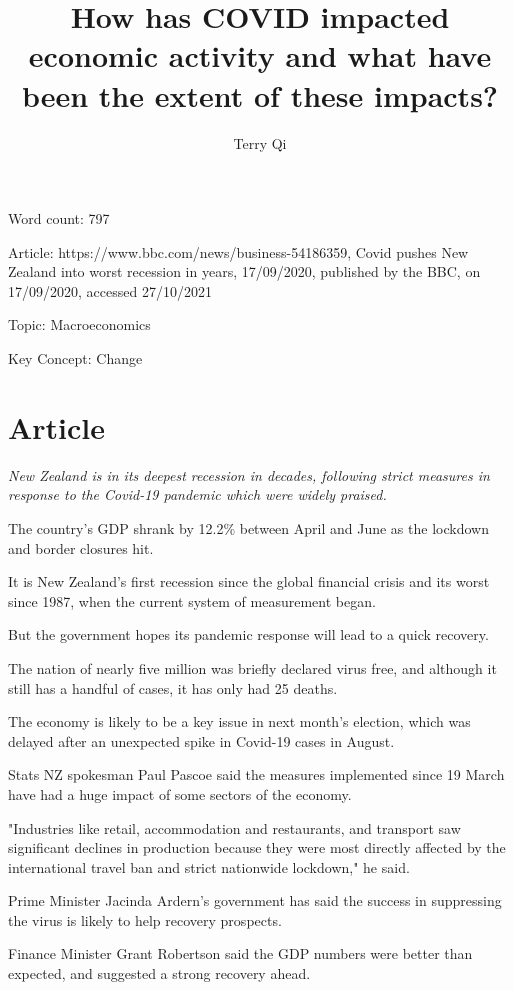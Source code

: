\documentclass[a4paper,12pt]{article}
\title{How has COVID impacted economic activity and what have been the extent of these impacts?}
\author{Terry Qi}
\begin{document}
\maketitle

Word count: 797

Article: https://www.bbc.com/news/business-54186359, Covid pushes New Zealand into worst recession in years, 17/09/2020, published by the BBC, on 17/09/2020, accessed 27/10/2021

Topic: Macroeconomics

Key Concept: Change

\newpage
\section*{Article}

\textit{New Zealand is in its deepest recession in decades, following strict measures in response to the Covid-19 pandemic which were widely praised.}

The country's GDP shrank by 12.2\% between April and June as the lockdown and border closures hit.

It is New Zealand's first recession since the global financial crisis and its worst since 1987, when the current system of measurement began.

But the government hopes its pandemic response will lead to a quick recovery.

The nation of nearly five million was briefly declared virus free, and although it still has a handful of cases, it has only had 25 deaths.

The economy is likely to be a key issue in next month's election, which was delayed after an unexpected spike in Covid-19 cases in August.

Stats NZ spokesman Paul Pascoe said the measures implemented since 19 March have had a huge impact of some sectors of the economy.

"Industries like retail, accommodation and restaurants, and transport saw significant declines in production because they were most directly affected by the international travel ban and strict nationwide lockdown," he said.

Prime Minister Jacinda Ardern's government has said the success in suppressing the virus is likely to help recovery prospects.

Finance Minister Grant Robertson said the GDP numbers were better than expected, and suggested a strong recovery ahead.
\end{document}
